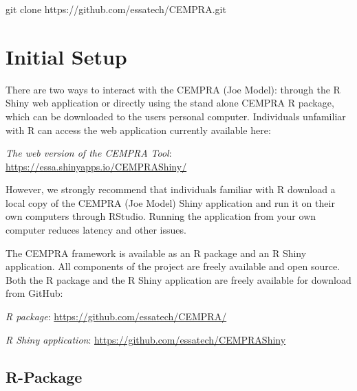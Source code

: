 \documentclass[
  letterpaper,
  DIV=11,
  numbers=noendperiod]{scrreprt}
\newenvironment{Shaded}{\begin{snugshade}}{\end{snugshade}}
\newcommand{\FunctionTok}[1]{\textcolor[rgb]{0.28,0.35,0.67}{#1}}
\newcommand{\NormalTok}[1]{\textcolor[rgb]{0.00,0.23,0.31}{#1}}
\begin{document}
\begin{Shaded}
\begin{Highlighting}[]
\FunctionTok{git}\NormalTok{ clone https://github.com/essatech/CEMPRA.git}
\end{Highlighting}
\end{Shaded}


\hypertarget{initial-setup-1}{%
\chapter{Initial Setup}\label{initial-setup-1}}

There are two ways to interact with the CEMPRA (Joe Model): through the
R Shiny web application or directly using the stand alone CEMPRA R
package, which can be downloaded to the users personal computer.
Individuals unfamiliar with R can access the web application currently
available here:

\emph{The web version of the CEMPRA Tool}:
\url{https://essa.shinyapps.io/CEMPRAShiny/}

However, we strongly recommend that individuals familiar with R download
a local copy of the CEMPRA (Joe Model) Shiny application and run it on
their own computers through RStudio. Running the application from your
own computer reduces latency and other issues.

The CEMPRA framework is available as an R package and an R Shiny
application. All components of the project are freely available and open
source. Both the R package and the R Shiny application are freely
available for download from GitHub:

\emph{R package}: \url{https://github.com/essatech/CEMPRA/}

\emph{R Shiny application}:
\url{https://github.com/essatech/CEMPRAShiny}

\hypertarget{r-package-2}{%
\section{R-Package}\label{r-package-2}}
\end{document}
